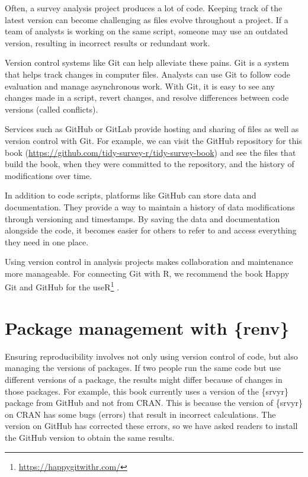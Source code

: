 \documentclass[
]{krantz}
\renewcommand{\href}[2]{#2\footnote{\url{#1}}}
\begin{document}
Often, a survey analysis project produces a lot of code. Keeping track of the latest version can become challenging as files evolve throughout a project. If a team of analysts is working on the same script, someone may use an outdated version, resulting in incorrect results or redundant work.

Version control systems like Git can help alleviate these pains. Git is a system that helps track changes in computer files. Analysts can use Git to follow code evaluation and manage asynchronous work. With Git, it is easy to see any changes made in a script, revert changes, and resolve differences between code versions (called conflicts).

Services such as GitHub or GitLab provide hosting and sharing of files as well as version control with Git. For example, we can visit the GitHub repository for this book (\url{https://github.com/tidy-survey-r/tidy-survey-book}) and see the files that build the book, when they were committed to the repository, and the history of modifications over time.

In addition to code scripts, platforms like GitHub can store data and documentation. They provide a way to maintain a history of data modifications through versioning and timestamps. By saving the data and documentation alongside the code, it becomes easier for others to refer to and access everything they need in one place.

Using version control in analysis projects makes collaboration and maintenance more manageable. For connecting Git with R, we recommend the book \href{https://happygitwithr.com/}{Happy Git and GitHub for the useR} \citep{git-w-R}.

\hypertarget{package-management-with-renv}{%
\section{Package management with \{renv\}}\label{package-management-with-renv}}

Ensuring reproducibility involves not only using version control of code, but also managing the versions of packages. If two people run the same code but use different versions of a package, the results might differ because of changes in those packages. For example, this book currently uses a version of the \{srvyr\} package from GitHub and not from CRAN. This is because the version of \{srvyr\} on CRAN has some bugs (errors) that result in incorrect calculations. The version on GitHub has corrected these errors, so we have asked readers to install the GitHub version to obtain the same results.
\end{document}
